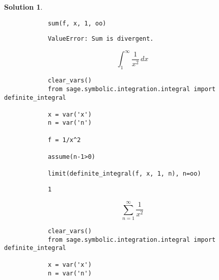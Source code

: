 \documentclass[10pt]{article}
\makeatletter
\theoremstyle{definition}
\newtheorem{soln}{Solution}
\newcommand{\boxspacing}{\kern\kvtcb@left@rule\kern\kvtcb@boxsep}
\newcommand{\prompt}[4]{
    \ttfamily\llap{{\color{#2}[#3]:\hspace{3pt}#4}}\vspace{-\baselineskip}
}
\makeatother
\begin{document}
\begin{soln}
\begin{tcolorbox}[breakable, size=fbox, boxrule=1pt, pad at break*=1mm,colback=cellbackground, colframe=cellborder]
\begin{verbatim}
            sum(f, x, 1, oo)
        \end{verbatim}
    \end{tcolorbox}
    \begin{tcolorbox}[breakable, size=fbox, boxrule=.5pt, pad at break*=1mm, opacityfill=0]
        \prompt{Out}{outcolor}{2}{\boxspacing}
        \begin{verbatim}
            ValueError: Sum is divergent.
        \end{verbatim}
    \end{tcolorbox}

    \newpage

    $$\int_{1}^{\infty} \frac{1}{x^2} \,dx$$
    \begin{tcolorbox}[breakable, size=fbox, boxrule=1pt, pad at break*=1mm,colback=cellbackground, colframe=cellborder]
        \prompt{In}{incolor}{3}{\boxspacing}
        \begin{verbatim}
            clear_vars()
            from sage.symbolic.integration.integral import definite_integral
            
            x = var('x')
            n = var('n')
            
            f = 1/x^2
            
            assume(n-1>0)
            
            limit(definite_integral(f, x, 1, n), n=oo)
        \end{verbatim}
    \end{tcolorbox}
    \begin{tcolorbox}[breakable, size=fbox, boxrule=.5pt, pad at break*=1mm, opacityfill=0]
        \prompt{Out}{outcolor}{3}{\boxspacing}
        \begin{verbatim}
            1
        \end{verbatim}
    \end{tcolorbox}

    $$\sum_{n = 1}^{\infty} \frac{1}{x^2}$$
    \begin{tcolorbox}[breakable, size=fbox, boxrule=1pt, pad at break*=1mm,colback=cellbackground, colframe=cellborder]
        \prompt{In}{incolor}{4}{\boxspacing}
        \begin{verbatim}
            clear_vars()
            from sage.symbolic.integration.integral import definite_integral
            
            x = var('x')
            n = var('n')
            

\end{verbatim}
\end{tcolorbox}
\end{soln}
\end{document}
